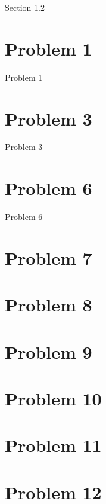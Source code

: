 \documentclass[12pt, a4paper]{article}
\begin{document}
\maketitle



\vspace{-4cm}

{Section 1.2}

\section{{Problem 1}}
        
		{Problem 1}
        
\section{{Problem 3}}
        
		{Problem 3}
		
\section{{Problem 6}}
        
		{Problem 6}
		
\section{{Problem 7}}
        
		
\section{{Problem 8}}
		

\section{{Problem 9}}
        

\section{{Problem 10}}

\section{{Problem 11}}

\section{{Problem 12}}

\end{document}
